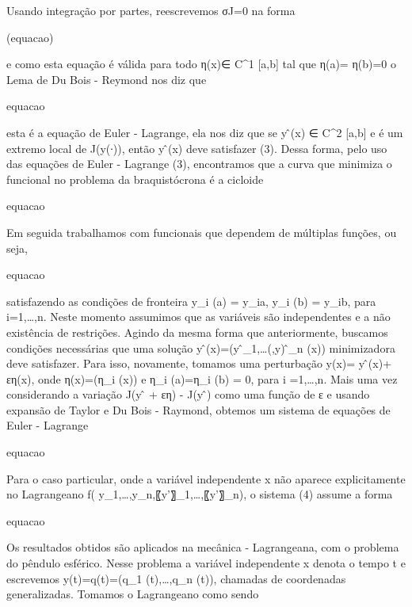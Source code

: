 \documentclass[12pt, a4paper]{article}
\begin{document}
Usando integração por partes, reescrevemos σJ=0 na forma

\begin{center}
(equacao)
\end{center}

e como esta equação é válida para todo η(x)∈ C^1 [a,b] tal que η(a)= η(b)=0 o Lema de Du Bois - Reymond nos diz que 

\begin{center}
equacao
\end{center}

esta é a equação de Euler - Lagrange, ela nos diz que se y ̂(x) ∈ C^2 [a,b] e é um extremo local de J(y(∙)), então y ̂(x) deve satisfazer (3). Dessa forma, pelo uso das equações de Euler - Lagrange (3), encontramos que a curva que minimiza o funcional no problema da braquistócrona é a cicloide

\begin{center}
equacao
\end{center}

Em seguida trabalhamos com funcionais que dependem de múltiplas funções, ou seja,

\begin{center}
equacao
\end{center}

satisfazendo as condições de fronteira y_i (a) = y_ia, y_i (b) = y_ib, para i=1,…,n. Neste momento assumimos que as variáveis são independentes e a não existência de restrições. Agindo da mesma forma que anteriormente, buscamos condições necessárias que uma solução y ̂(x)=(y ̂_1,…(,y) ̂_n (x)) minimizadora deve satisfazer. Para isso, novamente, tomamos uma perturbação y(x)= y ̂(x)+ εη(x), onde η(x)=(η_i (x))   e  η_i (a)=η_i (b)  = 0,
para i =1,…,n. Mais uma vez considerando a variação J(y ̂  + εη) - J(y ̂) como uma função de ε e usando expansão de Taylor e Du Bois - Raymond, obtemos um sistema de equações de Euler - Lagrange

\begin{center}
equacao
\end{center}

Para o caso particular, onde a variável independente x não aparece explicitamente no Lagrangeano f( y_1,…,y_n,〖y'〗_1,…,〖y'〗_n), o sistema (4) assume a forma

\begin{center}
equacao
\end{center}

Os resultados obtidos são aplicados na mecânica - Lagrangeana, com o problema do pêndulo esférico. Nesse problema a variável independente x denota o tempo t e escrevemos y(t)=q(t)=(q_1 (t),…,q_n (t)), chamadas de coordenadas generalizadas. Tomamos o Lagrangeano como sendo
\end{document}
